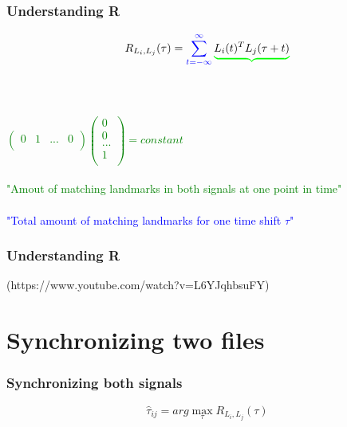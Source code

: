 \documentclass{beamer}
\begin{document}
\begin{frame}
\frametitle{Understanding R}
\begin{displaymath}
R_{  L_i,L_j  }(\tau)=  \textcolor{blue}{  \sum_{t = -\infty}^{\infty} \textcolor{green}{ \underbrace{ \textcolor{black}{ L_i(t)^T L_j(\tau +t)} }}}
\end{displaymath}
\ \\
\ \\
\begin{center}
\textcolor{green}{
$
\begin{pmatrix}
0 & 1 & ... & 0 \\
\end{pmatrix}
\left( \begin{array}{c}
0\\
0\\
...\\
1\\
\end{array}
\right)
= constant
$
}
\ \\
\ \\
\textcolor{green}{"Amout of matching landmarks in both signals at one point in time"}
\ \\
\ \\
\textcolor{blue}{"Total amount of matching landmarks for one time shift $\tau$"}
\end{center}
\end{frame}




\begin{frame}
\frametitle{Understanding R}
\begin{center}
\end{center}
(https://www.youtube.com/watch?v=L6YJqhbsuFY) 
\end{frame}



\section{Synchronizing two files}
\begin{frame}
\frametitle{Synchronizing both signals}
\begin{displaymath}
\hat{\tau}_{ij} = arg \max_{\tau} R_{L_{i}, L_{j}} (\tau)
\end{displaymath}
\end{frame}
\end{document}
